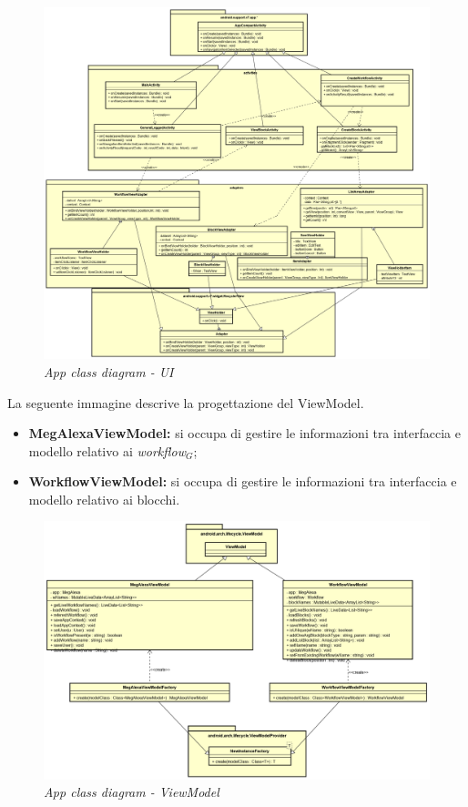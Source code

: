 \clearpage
\begin{figure} [H]
	\centering
	\includegraphics[scale=0.3]{./images/UI.png}
	\caption{\textit{App class diagram - UI}}\label{UI}
\end{figure}
\newpage
La seguente immagine descrive la progettazione del ViewModel.
\begin{itemize}
	\item \textbf{MegAlexaViewModel:} si occupa di gestire le informazioni tra interfaccia e modello relativo ai \textit{workflow$_{G}$};  
	\item \textbf{WorkflowViewModel:} si occupa di gestire le informazioni tra interfaccia e modello relativo ai blocchi.
\end{itemize}
\begin{figure} [H]
	\centering
	\includegraphics[scale=0.3]{./images/ViewModel.png}
	\caption{\textit{App class diagram - ViewModel}}\label{ViewModel}
\end{figure}
